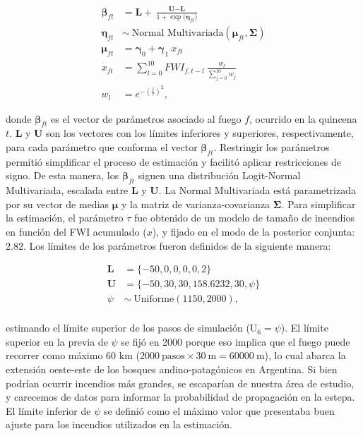 \begin{equation}
\label{eq:hier1}
\begin{aligned}
    \boldsymbol{\beta}_{ft} &= \textbf{L} + \frac{\textbf{U} - \textbf{L}}{1 + \exp{(\boldsymbol{\eta}_{ft}})} \\
    \boldsymbol{\eta}_{ft} &\sim \ \text{Normal Multivariada}(\boldsymbol{\mu}_{ft}, \boldsymbol{\Sigma}) \\
    \boldsymbol{\mu}_{ft} &= \boldsymbol{\gamma}_0 + \boldsymbol{\gamma}_1 \ x_{ft} \\
    x_{ft} &= \sum_{l=0}^{10} FWI_{f,t-l} \ \frac{w_l}{\sum_{j=0}^{10} w_j} \\
    w_l &= e^{-\left(\frac{l}{\tau}\right)^2},
\end{aligned}
\end{equation}

\noindent donde $\boldsymbol{\beta}_{ft}$ es el vector de parámetros asociado al fuego $f$, ocurrido en la quincena $t$. $\textbf{L}$ y $\textbf{U}$ son los vectores con los límites inferiores y superiores, respectivamente, para cada parámetro que conforma el vector $\boldsymbol{\beta}_{ft}$. Restringir los parámetros permitió simplificar el proceso de estimación y facilitó aplicar restricciones de signo. De esta manera, los $\boldsymbol{\beta}_{ft}$ siguen una distribución Logit-Normal Multivariada, escalada entre $\textbf{L}$ y $\textbf{U}$. La Normal Multivariada está parametrizada por su vector de medias $\boldsymbol{\mu}$ y la matriz de varianza-covarianza $\boldsymbol{\Sigma}$. Para simplificar la estimación, el parámetro $\tau$ fue obtenido de un modelo de tamaño de incendios en función del FWI acumulado ($x$), y fijado en el modo de la posterior conjunta: $2.82$. Los límites de los parámetros fueron definidos de la siguiente manera:

\begin{equation}
\label{eq:limits}
\begin{aligned}
    \textbf{L} &= \{-50, 0, 0, 0, 0, 2\} \\
    \textbf{U} &= \{-50, 30, 30, 158.6232, 30, \psi\} \\ 
    \psi &\sim \ \text{Uniforme}(1150, 2000), \\
\end{aligned}
\end{equation}

\noindent estimando el límite superior de los pasos de simulación ($\text{U}_6 = \psi$). El límite superior en la previa de $\psi$ se fijó en 2000 porque eso implica que el fuego puede recorrer como máximo 60 km ($2000 \ \text{pasos} \times 30 \ \text{m} = 60000 \ \text{m}$), lo cual abarca la extensión oeste-este de los bosques andino-patagónicos en Argentina. Si bien podrían ocurrir incendios más grandes, se escaparían de nuestra área de estudio, y carecemos de datos para informar la probabilidad de propagación en la estepa. El límite inferior de $\psi$ se definió como el máximo valor que presentaba buen ajuste para los incendios utilizados en la estimación. 

